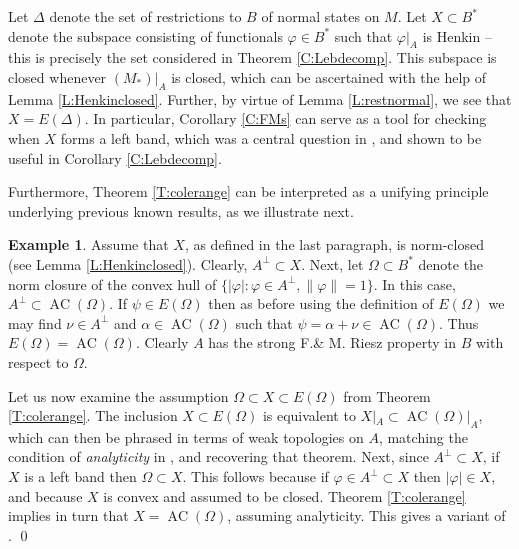 \documentclass[10pt]{amsart}
\renewcommand{\phi}{\varphi}
\newcommand{\AC}{\operatorname{AC}}
\theoremstyle{definition}
\newtheorem{example}{Example}
\begin{document}
Let $\Delta$ denote the set of restrictions to $B$ of normal states on $M$.  Let $X\subset B^*$ denote the subspace consisting of functionals $\phi\in B^*$ such that $\phi|_A$ is Henkin -- this is precisely the set considered in Theorem \ref{C:Lebdecomp}. This subspace is closed whenever $(M_*)|_A$ is closed, which can be ascertained with the help of Lemma \ref{L:Henkinclosed}. Further, by virtue of Lemma \ref{L:restnormal}, we see that $X=E(\Delta)$. In particular, Corollary \ref{C:FMs} can serve as a tool for checking when $X$ forms a left band,
which was a central question in \cite{CT2023Henkin}, and shown to be useful in Corollary \ref{C:Lebdecomp}. 

Furthermore, Theorem \ref{T:colerange}  can  be interpreted as a unifying principle underlying previous known results, as we illustrate next.

\begin{example}\label{E:Henkin}
Assume that $X$, as defined in the last paragraph, is norm-closed (see Lemma  \ref{L:Henkinclosed}).
Clearly, $A^\perp\subset X$. Next, let $\Omega\subset B^*$ denote  the norm closure of the convex hull of $\{|\phi|:\phi\in A^\perp,\|\phi\|=1\}$. In this case, $A^\perp\subset \AC(\Omega)$.
If $\psi \in E(\Omega)$ then as before using the definition of $E(\Omega)$ we may  find 
 $\nu\in A^\perp$ and $\alpha\in \AC(\Omega)$ such that $\psi =\alpha+\nu \in \AC(\Omega)$.   Thus 
 $E(\Omega)=\AC(\Omega)$.
 Clearly $A$ has the strong F.\& M. Riesz property in $B$ with respect to $\Omega$.

Let us now examine the assumption $\Omega\subset X\subset E(\Omega)$ from Theorem \ref{T:colerange}.
The inclusion $X\subset E(\Omega)$ is equivalent to $X|_A\subset \AC(\Omega)|_A$, which can then be phrased in terms of weak topologies on $A$, 
matching  the condition of \emph{analyticity} in \cite[Theorem 4.4]{CT2023Henkin}, and
recovering that theorem. 
Next, since  $A^\perp \subset X$, if $X$ is a left band  then $\Omega\subset X$.
This follows because  if $\varphi \in A^\perp \subset X$ then $| \phi | \in X$, and because $X$ is convex and assumed to be closed. 
Theorem \ref{T:colerange}  implies in turn that $X=\AC(\Omega)$, assuming analyticity. This gives a 
variant of \cite[Theorem 4.5]{CT2023Henkin}.
\qed
\end{example}
\end{document}
